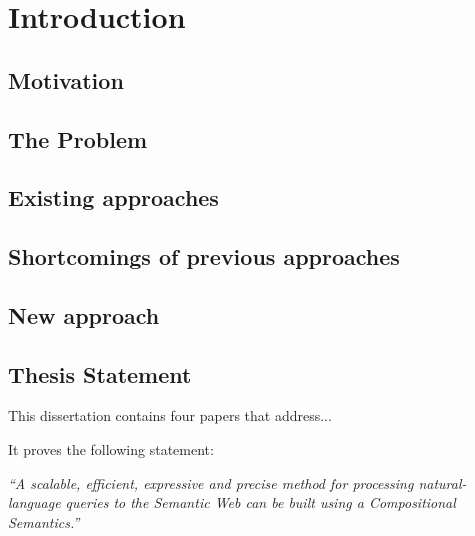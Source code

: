 \documentclass[../main.tex]{subfiles}
\begin{document}
\chapter{Introduction}
\begin{refsection}

\label{chapter:intro}


\section{Motivation}



\section {The Problem}




\section {Existing approaches}



\section {Shortcomings of previous approaches}


\section {New approach}


\section{Thesis Statement}

This dissertation contains four papers that address...

It proves the following statement:

\textit{``A scalable, efficient, expressive and precise method for processing natural-language queries to the Semantic Web can be built using a Compositional Semantics.''}


\end{refsection}
\end{document}

